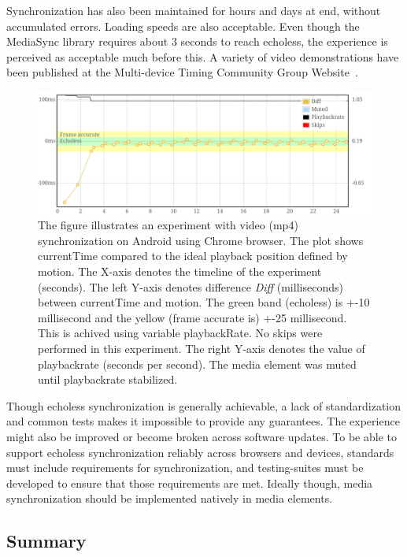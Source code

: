 \documentclass[graybox]{svmult}
\begin{document}
Synchronization has also been maintained for hours and days at end, without
accumulated errors. Loading speeds are also acceptable. Even though the
MediaSync library requires about 3 seconds to reach echoless, the experience
is perceived as acceptable much before this. A variety of video demonstrations
have been published at the Multi-device Timing Community Group
Website~\cite{mtcg}.

\begin{figure}[h]
\centering
\includegraphics[scale=.23]{fig/android-video.png}
\caption{The figure illustrates an experiment with video (mp4) synchronization on
Android using Chrome browser. The plot shows currentTime compared to the ideal
playback position defined by motion. The X-axis denotes the timeline of the experiment (seconds).
The left Y-axis denotes difference \emph{Diff} (milliseconds) between currentTime and motion.
The green band (echoless) is +-10 millisecond and the yellow (frame accurate is) +-25 millisecond. 
This is achived using variable playbackRate. No skips were performed in this experiment. 
The right Y-axis denotes the value of playbackrate (seconds per second). The media element was muted until playbackrate stabilized.}
\label{fig:videosync}
\end{figure}

Though echoless synchronization is generally achievable, a lack of
standardization and common tests makes it impossible to provide any
guarantees. The experience might also be improved or become broken across
software updates. To be able to support echoless synchronization reliably
across browsers and devices, standards must include requirements for
synchronization, and testing-suites must be developed to ensure that those
requirements are met. Ideally though, media synchronization should be
implemented natively in media elements.


\subsection {Summary}
\end{document}
